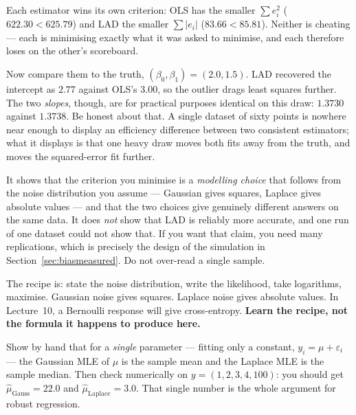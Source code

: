 \documentclass[11pt]{article}
\begin{document}
Each estimator wins its own criterion: OLS has the smaller
$\sum e_i^2$ ($622.30 < 625.79$) and LAD the smaller $\sum|e_i|$
($83.66 < 85.81$). Neither is cheating --- each is minimising exactly what it
was asked to minimise, and each therefore loses on the other's scoreboard.

Now compare them to the truth, $(\beta_0, \beta_1) = (2.0, 1.5)$. LAD
recovered the intercept as $2.77$ against OLS's $3.00$, so the outlier drags
least squares further. The two \emph{slopes}, though, are for practical
purposes identical on this draw: $1.3730$ against $1.3738$. Be honest about
that. A single dataset of sixty points is nowhere near enough to display an
efficiency difference between two consistent estimators; what it displays is
that one heavy draw moves both fits away from the truth, and moves the
squared-error fit further.

\begin{caution}
It shows that the criterion you minimise is a \emph{modelling choice} that
follows from the noise distribution you assume --- Gaussian gives squares,
Laplace gives absolute values --- and that the two choices give genuinely
different answers on the same data. It does \emph{not} show that LAD is
reliably more accurate, and one run of one dataset could not show that. If you
want that claim, you need many replications, which is precisely the design of
the simulation in Section~\ref{sec:biasmeasured}. Do not over-read a single
sample.
\end{caution}

\begin{keyidea}
The recipe is: state the noise distribution, write the likelihood, take
logarithms, maximise. Gaussian noise gives squares. Laplace noise gives
absolute values. In Lecture~10, a Bernoulli response will give cross-entropy.
\textbf{Learn the recipe, not the formula it happens to produce here.}
\end{keyidea}

\begin{tryit}
Show by hand that for a \emph{single} parameter --- fitting only a constant,
$y_i = \mu + \varepsilon_i$ --- the Gaussian MLE of $\mu$ is the sample mean
and the Laplace MLE is the sample median. Then check numerically on
$y = (1, 2, 3, 4, 100)$: you should get $\hat\mu_{\text{Gauss}} = 22.0$ and
$\hat\mu_{\text{Laplace}} = 3.0$. That single number is the whole argument for
robust regression.
\end{tryit}
\end{document}
